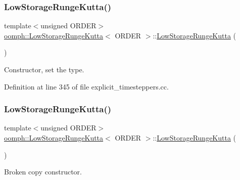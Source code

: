 \subsubsection{\texorpdfstring{Low\+Storage\+Runge\+Kutta()}{LowStorageRungeKutta()}\hspace{0.1cm}{\footnotesize\ttfamily [1/3]}}
{\footnotesize\ttfamily template$<$unsigned O\+R\+D\+ER$>$ \\
\hyperlink{classoomph_1_1LowStorageRungeKutta}{oomph\+::\+Low\+Storage\+Runge\+Kutta}$<$ O\+R\+D\+ER $>$\+::\hyperlink{classoomph_1_1LowStorageRungeKutta}{Low\+Storage\+Runge\+Kutta} (\begin{DoxyParamCaption}{ }\end{DoxyParamCaption})}



Constructor, set the type. 



Definition at line 345 of file explicit\+\_\+timesteppers.\+cc.

\mbox{\label{classoomph_1_1LowStorageRungeKutta_a5cc6f1c22d9d279ed095c755f04e0a04}} 
\subsubsection{\texorpdfstring{Low\+Storage\+Runge\+Kutta()}{LowStorageRungeKutta()}\hspace{0.1cm}{\footnotesize\ttfamily [2/3]}}
{\footnotesize\ttfamily template$<$unsigned O\+R\+D\+ER$>$ \\
\hyperlink{classoomph_1_1LowStorageRungeKutta}{oomph\+::\+Low\+Storage\+Runge\+Kutta}$<$ O\+R\+D\+ER $>$\+::\hyperlink{classoomph_1_1LowStorageRungeKutta}{Low\+Storage\+Runge\+Kutta} (\begin{DoxyParamCaption}\item[{const \hyperlink{classoomph_1_1LowStorageRungeKutta}{Low\+Storage\+Runge\+Kutta}$<$ O\+R\+D\+ER $>$ \&}]{ }\end{DoxyParamCaption})\hspace{0.3cm}{\ttfamily [inline]}}



Broken copy constructor. 



